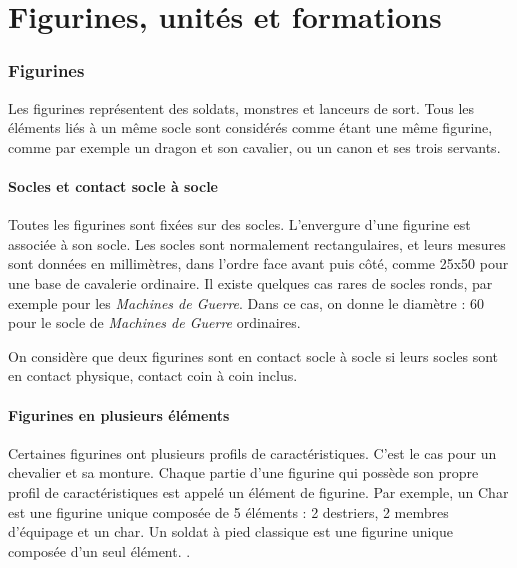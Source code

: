 
\part{Figurines, unités et formations}

\section{Figurines}

Les figurines représentent des soldats, monstres et lanceurs de sort. Tous les éléments liés à un même socle sont considérés comme étant une même figurine, comme par exemple un dragon et son cavalier, ou un canon et ses trois servants.

\subsection{Socles et contact socle à socle}

Toutes les figurines sont fixées sur des socles. L'envergure d'une figurine est associée à son socle. Les socles sont normalement rectangulaires, et leurs mesures sont données en millimètres, dans l'ordre face avant puis côté, comme 25x50 {\milli\meter} pour une base de cavalerie ordinaire. Il existe quelques cas rares de socles ronds, par exemple pour les \emph{Machines de Guerre}. Dans ce cas, on donne le diamètre : 60 {\milli\meter} pour le socle de \emph{Machines de Guerre} ordinaires.

On considère que deux figurines sont en contact socle à socle si leurs socles sont en contact physique, contact coin à coin inclus.

\subsection{Figurines en plusieurs éléments}

Certaines figurines ont plusieurs profils de caractéristiques. C'est le cas pour un chevalier et sa monture. Chaque partie d'une figurine qui possède son propre profil de caractéristiques est appelé un élément de figurine. Par exemple, un Char est une figurine unique composée de 5 éléments : 2 destriers, 2 membres d'équipage et un char. Un soldat à pied classique est une figurine unique composée d'un seul élément. .

